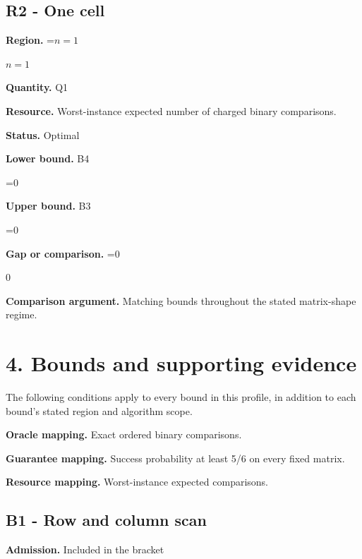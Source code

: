 \documentclass[10pt,a4paper]{article}
\newcommand{\AtlasMath}[1]{\par\begingroup\centering\setbox0=\hbox{$\displaystyle #1$}\ifdim\wd0>1.4\linewidth\typeout{ATLAS WIDE FORMULA: \the\wd0}\fi\ifdim\wd0>\linewidth\resizebox{\linewidth}{!}{\box0}\else\box0\fi\par\endgroup}
\newcommand{\AtlasInlineMath}[1]{\begingroup\setbox0=\hbox{$#1$}\ifdim\wd0>.4\linewidth\endgroup\AtlasMath{#1}\else\endgroup$#1$\fi}
\begin{document}
\subsection{R2 - One cell}


\textbf{Region.} \AtlasInlineMath{n=1}



\textbf{Quantity.} Q1



\textbf{Resource.} Worst-instance expected number of charged binary comparisons.



\textbf{Status.} Optimal



\textbf{Lower bound.} B4



\AtlasMath{0}


\textbf{Upper bound.} B3



\AtlasMath{0}


\textbf{Gap or comparison.} \AtlasInlineMath{0}



\textbf{Comparison argument.} Matching bounds throughout the stated matrix-shape regime.



\section{4. Bounds and supporting evidence}


The following conditions apply to every bound in this profile, in addition to each bound's stated region and algorithm scope.



\textbf{Oracle mapping.} Exact ordered binary comparisons.



\textbf{Guarantee mapping.} Success probability at least 5/6 on every fixed matrix.



\textbf{Resource mapping.} Worst-instance expected comparisons.



\subsection{B1 - Row and column scan}


\textbf{Admission.} Included in the bracket
\end{document}
